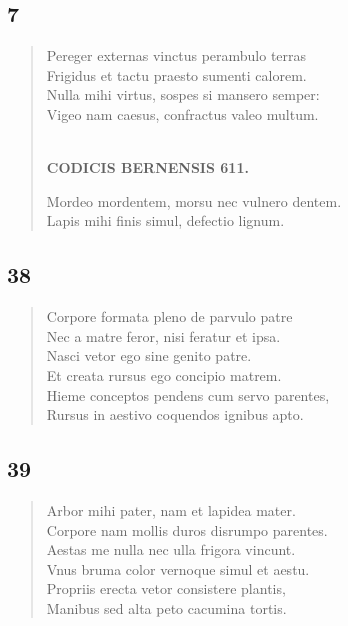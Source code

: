 \documentclass[11pt, a4paper]{report}
\begin{document}
            \subsection*{7}
      \begin{verse}
      Pereger externas vinctus perambulo terras \\ Frigidus et tactu praesto sumenti calorem. \\ Nulla mihi virtus, sospes si mansero semper: \\ Vigeo nam caesus, confractus valeo multum. \\ 
        ﻿\pagebreak 
    \begin{center} \textbf{CODICIS BERNENSIS 611.} \end{center} \marginpar{[363]} Mordeo mordentem, morsu nec vulnero dentem. \\ Lapis mihi finis simul, defectio lignum. \\ 
      \end{verse}
  
            \subsection*{38}
      \begin{verse}
      Corpore formata pleno de parvulo patre \\ Nec a matre feror, nisi feratur et ipsa. \\ Nasci vetor ego sine genito patre. \\ Et creata rursus ego concipio matrem. \\ Hieme conceptos pendens cum servo parentes, \\ Rursus in aestivo coquendos ignibus apto. \\ 
      \end{verse}
  
            \subsection*{39}
      \begin{verse}
      Arbor mihi pater, nam et lapidea mater. \\ Corpore nam mollis duros disrumpo parentes. \\ Aestas me nulla nec ulla frigora vincunt. \\ Vnus bruma color vernoque simul et aestu. \\ Propriis erecta vetor consistere plantis, \\ Manibus sed alta peto cacumina tortis. \\ 
      \end{verse}
  
\end{document}
